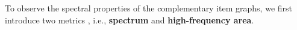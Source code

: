 \documentclass[letterpaper]{article} %
\begin{document}
To observe the spectral properties of the complementary item graphs, we first introduce two metrics \cite{tang2022rethinking}, i.e., \textbf{spectrum} and \textbf{high-frequency area}. 
\end{document}
